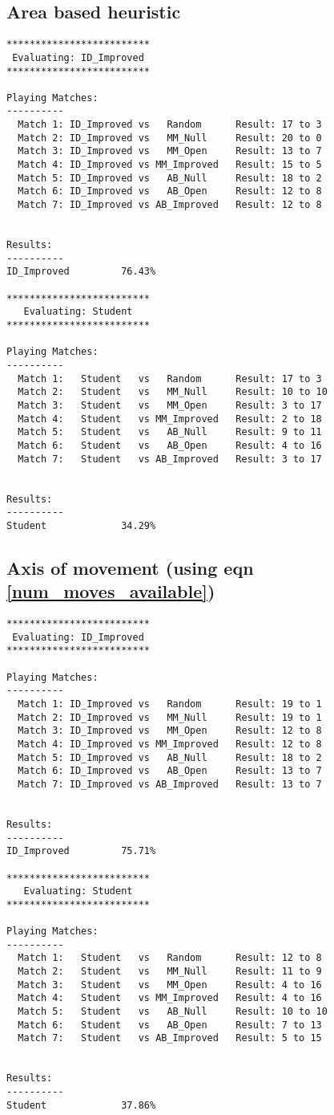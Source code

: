 \documentclass[11pt]{article}
\begin{document}
\subsection{Area based heuristic}
\begin{verbatim}
*************************
 Evaluating: ID_Improved 
*************************

Playing Matches:
----------
  Match 1: ID_Improved vs   Random    	Result: 17 to 3
  Match 2: ID_Improved vs   MM_Null   	Result: 20 to 0
  Match 3: ID_Improved vs   MM_Open   	Result: 13 to 7
  Match 4: ID_Improved vs MM_Improved 	Result: 15 to 5
  Match 5: ID_Improved vs   AB_Null   	Result: 18 to 2
  Match 6: ID_Improved vs   AB_Open   	Result: 12 to 8
  Match 7: ID_Improved vs AB_Improved 	Result: 12 to 8


Results:
----------
ID_Improved         76.43%

*************************
   Evaluating: Student   
*************************

Playing Matches:
----------
  Match 1:   Student   vs   Random    	Result: 17 to 3
  Match 2:   Student   vs   MM_Null   	Result: 10 to 10
  Match 3:   Student   vs   MM_Open   	Result: 3 to 17
  Match 4:   Student   vs MM_Improved 	Result: 2 to 18
  Match 5:   Student   vs   AB_Null   	Result: 9 to 11
  Match 6:   Student   vs   AB_Open   	Result: 4 to 16
  Match 7:   Student   vs AB_Improved 	Result: 3 to 17


Results:
----------
Student             34.29%
\end{verbatim}

\subsection{Axis of movement (using eqn \ref{num_moves_available})}

\begin{verbatim}
*************************
 Evaluating: ID_Improved 
*************************

Playing Matches:
----------
  Match 1: ID_Improved vs   Random    	Result: 19 to 1
  Match 2: ID_Improved vs   MM_Null   	Result: 19 to 1
  Match 3: ID_Improved vs   MM_Open   	Result: 12 to 8
  Match 4: ID_Improved vs MM_Improved 	Result: 12 to 8
  Match 5: ID_Improved vs   AB_Null   	Result: 18 to 2
  Match 6: ID_Improved vs   AB_Open   	Result: 13 to 7
  Match 7: ID_Improved vs AB_Improved 	Result: 13 to 7


Results:
----------
ID_Improved         75.71%

*************************
   Evaluating: Student   
*************************

Playing Matches:
----------
  Match 1:   Student   vs   Random    	Result: 12 to 8
  Match 2:   Student   vs   MM_Null   	Result: 11 to 9
  Match 3:   Student   vs   MM_Open   	Result: 4 to 16
  Match 4:   Student   vs MM_Improved 	Result: 4 to 16
  Match 5:   Student   vs   AB_Null   	Result: 10 to 10
  Match 6:   Student   vs   AB_Open   	Result: 7 to 13
  Match 7:   Student   vs AB_Improved 	Result: 5 to 15


Results:
----------
Student             37.86%
\end{verbatim}
\end{document}
